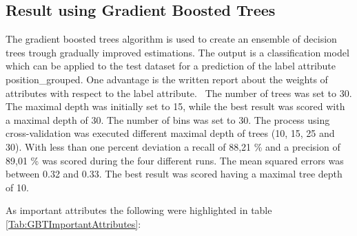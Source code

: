 \subsection{Result using Gradient Boosted Trees}

The gradient boosted trees algorithm is used to create an ensemble of decision trees trough gradually improved estimations. The output is a classification model which can be applied to the test dataset for a prediction of the label attribute position\_grouped. \newline
One advantage is the written report about the weights of attributes with respect to the label attribute.~\cite{ref_rapidminergbt}
The number of trees was set to 30. The maximal depth was initially set to 15, while the best result was scored with a maximal depth of 30.
The number of bins was set to 30.  
The process using cross-validation was executed different maximal depth of trees (10, 15, 25 and 30). With less than one percent deviation a recall of 88,21 \% and a precision of 89,01 \% was scored during the four different runs. The mean squared  errors was between 0.32 and 0.33. The best result was scored having a maximal tree depth of 10.


As important attributes the following were highlighted in table \ref{Tab:GBTImportantAttributes}:

